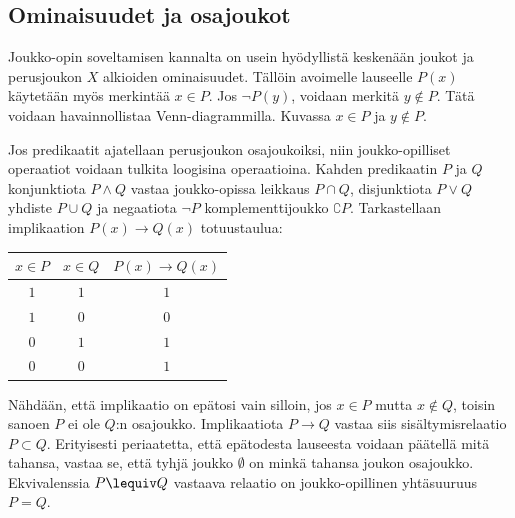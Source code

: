 \subsection*{Ominaisuudet ja osajoukot}
Jouk\-ko-opin soveltamisen kannalta on usein hyödyllistä  keskenään joukot ja perusjoukon $X$ alkioiden ominaisuudet. Tällöin avoimelle lauseelle $P(x)$ käytetään myös merkintää $x\in P$. Jos $\lnot P(y)$, voidaan merkitä $y\notin P$. Tätä voidaan havainnollistaa Venn-diagrammilla. Kuvassa $x\in P$ ja $y\notin P$.

\begin{center}



\end{center}

Jos predikaatit ajatellaan perusjoukon osajoukoiksi, niin joukko-opil\-li\-set operaatiot voidaan tulkita loogisina operaatioina. Kahden predikaatin $P$ ja $Q$ konjunktiota $P\land Q$ vastaa joukko-opissa leikkaus $P\cap Q$, disjunktiota $P \lor Q$ yhdiste $P\cup Q$ ja negaatiota $\lnot P$ komplementtijoukko $\complement P$. 
Tarkastellaan implikaation $P(x)\to Q(x)$ totuustaulua:

\bigskip

\begin{center}
\begin{tabular}{|c|c|c|}\hline
$x\in P$ & $x \in Q$ & $P(x) \to Q(x)$ \\ \hline
$1$ & $1$ & $1$\\ %
$1$ & $0$ & $0$\\
$0$ & $1$ & $1$\\
$0$ & $0$ & $1$\\ \hline
\end{tabular}
\end{center}

\bigskip

Nähdään, että implikaatio on epätosi vain silloin, jos $x \in P$ mutta $x\not \in Q$, toisin sanoen $P$ ei ole $Q$:n osajoukko. Implikaatiota $P \to Q$ vastaa siis sisältymisrelaatio $P \subset Q$. Erityisesti periaatetta, että epätodesta lauseesta voidaan päätellä mitä tahansa, vastaa se, että tyhjä joukko $\emptyset$ on minkä tahansa joukon osajoukko. Ekvivalenssia $P\lequiv Q$ vastaava relaatio on joukko-opillinen yhtäsuuruus $P=Q$.

